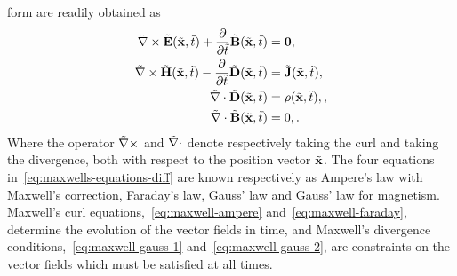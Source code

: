 form are readily obtained as
\begin{subequations}
  \label{eq:maxwells-equations-diff}
  \begin{align}
    \tilde{\nabla} \times \tilde{\mathbf{E}}(\tilde{\mathbf{x}},\tilde{t}) + \frac{\partial}{\partial \tilde{t} } \tilde{\mathbf{B}}(\tilde{\mathbf{x}}, \tilde{t})&= \mathbf{0}, \label{eq:maxwell-faraday} \\
    \tilde{\nabla} \times \tilde{\mathbf{H}}(\tilde{\mathbf{x}},\tilde{t}) - \frac{\partial}{\partial \tilde{t} } \tilde{\mathbf{D}}(\tilde{\mathbf{x}}, \tilde{t})&= \tilde{\mathbf{J}}(\tilde{\mathbf{x}},\tilde{t}), \label{eq:maxwell-ampere} \\
    \tilde{\nabla} \cdot \tilde{\mathbf{D}} (\tilde{\mathbf{x}},\tilde{t}) &= \rho(\tilde{\mathbf{x}},\tilde{t}), \label{eq:maxwell-gauss-1}, \\
    \tilde{\nabla} \cdot \tilde{\mathbf{B}} (\tilde{\mathbf{x}},\tilde{t}) &= 0, \label{eq:maxwell-gauss-2} .
  \end{align}
\end{subequations}
Where the operator $\tilde{\nabla} \times$ and $\tilde{\nabla} \cdot$ denote respectively taking the curl and taking the divergence, both with respect to the position vector $\tilde{\mathbf{x}}$.
The four equations in~\eqref{eq:maxwells-equations-diff} are known respectively
as Ampere's law with Maxwell's correction, Faraday's law, Gauss' law and Gauss'
law for magnetism. Maxwell's curl equations,~\eqref{eq:maxwell-ampere}
and~\eqref{eq:maxwell-faraday}, determine the evolution of the vector fields in
time, and Maxwell's divergence conditions,~\eqref{eq:maxwell-gauss-1}
and~\eqref{eq:maxwell-gauss-2}, are constraints on the vector fields which must
be satisfied at all times.

